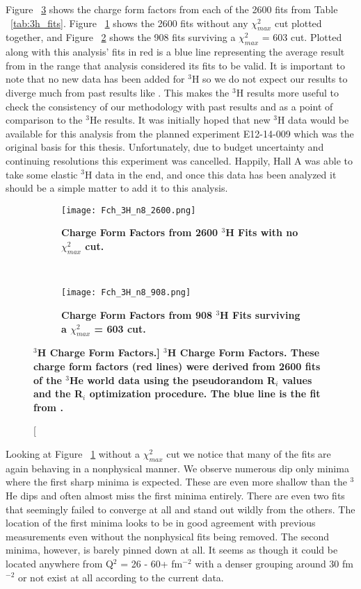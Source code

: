 Figure ~\ref{fig:3h_fch} shows the charge form factors from each of the 2600 fits from Table ~\ref{tab:3h_fits}. Figure ~\ref{fig:3h_fch_no_cut} shows the 2600 fits without any $\chi^2_{max}$ cut plotted together, and Figure ~\ref{fig:3h_fch_cut} shows the 908 fits surviving a $\chi^2_{max}$ = 603 cut. Plotted along with this analysis' fits in red is a blue line representing the average result from \cite{Article:Amroun} in the range that analysis considered its fits to be valid. It is important to note that no new data has been added for $^3$H so we do not expect our results to diverge much from past results like \cite{Article:Amroun}. This makes the $^3$H results more useful to check the consistency of our methodology with past results and as a point of comparison to the $^3$He results. It was initially hoped that new $^3$H data would be available for this analysis from the planned experiment E12-14-009 \cite{3h_proposal} which was the original basis for this thesis. Unfortunately, due to budget uncertainty and continuing resolutions this experiment was cancelled. Happily, Hall A was able to take some elastic $^3$H data in the end, and once this data has been analyzed it should be a simple matter to add it to this analysis.

\begin{figure}[!ht]
\begin{subfigure}{1.\textwidth}
  \centering
  \texttt{[image: Fch\_3H\_n8\_2600.png]}
  \caption{\bf{Charge Form Factors from 2600 $^3$H Fits with no $\chi^2_{max}$ cut.}}
  \label{fig:3h_fch_no_cut}
\end{subfigure}\\
\begin{subfigure}{1.\textwidth}
  \centering
  \texttt{[image: Fch\_3H\_n8\_908.png]}
  \caption{\bf{Charge Form Factors from 908 $^3$H Fits surviving a $\chi^2_{max}$ = 603 cut.}}
  \label{fig:3h_fch_cut}
\end{subfigure}
\caption[\bf{$^3$H Charge Form Factors.}] {
{\bf{$^3$H Charge Form Factors.}} These charge form factors (red lines) were derived from 2600 fits of the $^3$He world data using the pseudorandom R$_i$ values and the R$_i$ optimization procedure. The blue line is the fit from \cite{Article:Amroun}.}
\label{fig:3h_fch}
\end{figure}

Looking at Figure ~\ref{fig:3h_fch_no_cut} without a $\chi^2_{max}$ cut we notice that many of the fits are again behaving in a nonphysical manner. We observe numerous dip only minima where the first sharp minima is expected. These are even more shallow than the $^3$He dips and often almost miss the first minima entirely. There are even two fits that seemingly failed to converge at all and stand out wildly from the others. The location of the first minima looks to be in good agreement with previous measurements even without the nonphysical fits being removed. The second minima, however, is barely pinned down at all. It seems as though it could be located anywhere from Q$^2$ = 26 - 60+ fm$^{-2}$ with a denser grouping around 30 fm$^{-2}$ or not exist at all according to the current data. 

